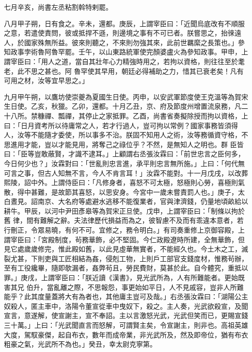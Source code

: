 \begin{pinyinscope}
 七月辛亥，尚書左丞粘割斡特剌罷。



 八月甲子朔，日有食之。辛未，還都。庚辰，上謂宰臣曰：「近聞烏底改有不順服之意，若遣使責問，彼或抵捍不遜，則邊境之事有不可已者。朕嘗思之，抬徠遠人，於國家殊無所益。彼來則聽之，不來則勿強其來，此前世羈縻之長策也。」參知政事孛術魯阿魯罕罷。壬午，以山東路統軍使完顏婆盧火為參知政事。甲申，上謂宰臣曰：「用人之道，當自其壯年心力精強時用之，若拘以資格，則往往至於耄老，此不思之甚也。阿
 魯罕使其早用，朝廷必得補助之力，惜其已衰老矣！凡有可用之材，汝等宜早思之。」



 九月甲午朔，以鷹坊使崇夔為夏國生日使。丙申，以安武軍節度使王克溫等為賀宋生日使。乙亥，秋獵。乙卯，還都。十月乙丑，京、府及節度州增置流泉務，凡二十八所。禁糠禪、瓢禪，其停止之家抵罪。乙酉，尚書省奏擬除授而拘以資格，上曰：「日月資考所以待庸常之人，若才行過人，豈可拘以常例？國家事務皆須得人，汝等不能隨才委使，所以事多不治。朕固不知用人之術，汝等務循資守格，不思進用才能，豈以才能見用，將奪己之祿位乎？不然，是無知人之明也。群
 臣皆曰：「臣等豈敢蔽賢，才識不逮耳。」上顧謂右丞張汝霖曰：「前世忠言之臣何多，今日何少也？」汝霖對曰：「世亂則忠言進，承平則忠言無所施。」上曰：「何代無可言之事，但古人知無不言，今人不肯言耳！」汝霖不能對。十一月戊戌，以改葬熙陵，詔中外。上謂侍臣曰：「凡修身者，喜怒不可太極，怒極則心勞，喜極則氣散，得中甚難，是故節其喜怒，以思安身。今宮中一歲未嘗責罰人也。」庚子，太白晝見。詔南京、大名府等處避水逃移不能復業者，官與津濟錢，仍量地頃畝給以耕牛。甲辰，以河中尹田彥皋等為賀宋正旦使。戊申，上謂宰臣曰：「制條以拘於舊
 律，間有難解之辭。夫法律歷代損益而為之，彼智慮不及而有乖違本意者，若行刪正，令眾易曉，有何不可。宜修之，務令明白。」有司奏重修上京御容殿，上謂宰臣曰：「宮殿制度，茍務華飾，必不堅固。今仁政殿遼時所建，全無華飾，但見它處歲歲修完，惟此殿如舊，以此見虛華無實者，不能經久也。今土木之工，滅裂尤甚，下則吏與工匠相結為姦，侵剋工物，上則戶工部官支錢度材，惟務茍辦，至有工役纔畢，隨即欹漏者，姦弊茍且，勞民費財，莫甚於此。自今體究，重抵以罪。」庚戌，上謂宰臣曰：「朕近讀《漢書》，見光武所為，人有所難能者。更始既害其兄
 伯升，當亂離之際，不思報怨，事更始如平日，人不見戚容，豈非人所難能乎？此其度量蓋將大有為者也，其他庸主豈可及哉。」右丞張汝霖曰：「湖陽公主奴殺人，匿主車中，洛陽令董宣從車中曳奴下，殺之。主人奏，光武欲殺宣，及聞宣言，意遂解，使宣謝主，宣不奉詔。主以言激怒光武，光武但笑而已，更賜宣錢三十萬。」上曰：「光武聞直言而怒解，可謂賢主矣，令宣謝主，則非也。高祖英雄大度，駕馭豪傑，起自布衣，數年而成帝業，非光武所及，然及即帝位，猶有布衣粗豪之氣，光武所不為也。」癸丑，幸太尉克寧第。




\end{pinyinscope}
